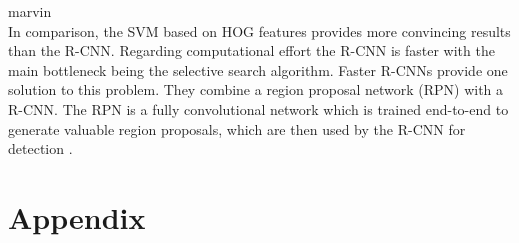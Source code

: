 \documentclass[12pt,a4paper,bibliography=totocnumbered,listof=totocnumbered]{scrartcl}
\begin{document}
\color{red} marvin \color{black}\\

In comparison, the SVM based on HOG features provides more convincing results than the R-CNN. Regarding computational effort the R-CNN is faster with the main bottleneck being the selective search algorithm. Faster R-CNNs provide one solution to this problem. They combine a region proposal network (RPN) with a R-CNN. The RPN is a fully convolutional network which is trained end-to-end to generate valuable region proposals, which are then used by the R-CNN for detection \cite{DBLP:journals/corr/RenHG015}. 




\pagebreak
\section{Appendix}
\end{document}
